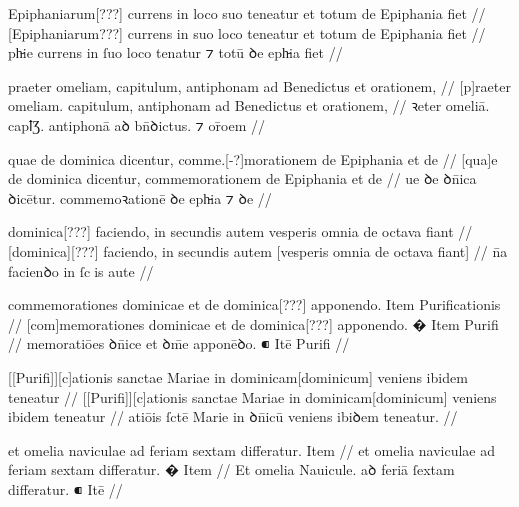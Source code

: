 \ex \bg
\gla
{}
 Epiphaniarum[???] currens in {} loco suo
teneatur et totum de Epiphania fiet
//
\glRekonstrukcja
{}
 [Epiphaniarum???] currens in suo loco {}
teneatur et totum de Epiphania fiet
//
\glU
{}
ph̵ie currens in ſuo loco {} tenatur ⁊ totū ꝺe eph̵ia fiet
//
\endgl
\eg



\ex \bg
\gla
{}
praeter omeliam, capitulum, antiphonam ad Benedictus et orationem,
//
\glRekonstrukcja
{}
[p]raeter omeliam. capitulum, antiphonam ad Benedictus et orationem,
//
\glU
{}
ꝛeter omeliā. capꝉƷ. antiphonā aꝺ bn̄ꝺictus. ⁊ or̄oem
//
\endgl
\eg



\ex \bg
\gla
{}
quae de dominica dicentur, comme.[-?]morationem de Epiphania et de
//
\glRekonstrukcja
{}
[qua]e de dominica dicentur, commemorationem de Epiphania et de
//
\glU
{}
ue ꝺe ꝺn̄ica ꝺicētur. commemoꝛationē ꝺe eph̵ia ⁊ ꝺe
//
\endgl
\eg




\ex \bg
\gla
{}
dominica[???] faciendo, in secundis autem
vesperis omnia de octava fiant 
//
\glRekonstrukcja
{}
[dominica][???] faciendo, in secundis autem
[vesperis omnia de octava fiant]
//
\glU
{}
n̄a facienꝺo in ſcis aute     
//
\endgl
\eg



\ex \bg
\gla
{}
commemorationes dominicae et de dominica[???] apponendo.
{} Item Purificationis
//
\glRekonstrukcja
{}
[com]memorationes dominicae et de dominica[???] apponendo.
� Item Purifi
//
\glU
{}
memoratiōes ꝺn̄ice et {} ꝺm̄e apponēꝺo. ⁌ Itē Purifi
//
\endgl
\eg



\ex \bg
\gla
{}
[[Purifi]][c]ationis sanctae Mariae in dominicam[dominicum] veniens ibidem
teneatur
//
\glRekonstrukcja
{}
[[Purifi]][c]ationis sanctae Mariae in dominicam[dominicum] veniens ibidem
teneatur
//
\glU
{}
atiōis ſctē Marie in ꝺn̄icū veniens ibiꝺem teneatur.
//
\endgl
\eg



\ex \bg
\gla
{}
et omelia naviculae ad feriam sextam differatur.
{} Item
//
\glRekonstrukcja
{}
et omelia naviculae ad feriam sextam differatur.
{�} Item
//
\glU
{}
Et omelia Nauicule. aꝺ feriā ſextam diﬀeratur. ⁌ Itē
//
\endgl
\eg



